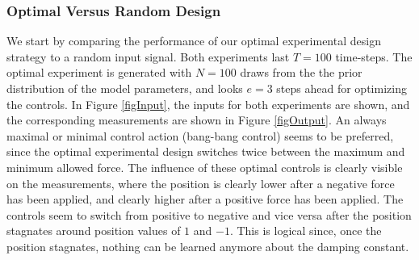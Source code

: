 \subsubsection{Optimal Versus Random Design}
We start by comparing the performance of our optimal experimental design strategy to a random input signal. Both experiments last $T=100$ time-steps. The optimal experiment is generated with $N=100$ draws from the the prior distribution of the model parameters, and looks $e=3$ steps ahead for optimizing the controls. In Figure \ref{figInput}, the inputs for both experiments are shown, and the corresponding measurements are shown in Figure \ref{figOutput}. An always maximal or minimal control action (bang-bang control) seems to be preferred, since the optimal experimental design switches twice between the maximum and minimum allowed force. The influence of these optimal controls is clearly visible on the measurements, where the position is clearly lower after a negative force has been applied, and clearly higher after a positive force has been applied. The controls seem to switch from positive to negative and vice versa after the position stagnates around position values of $1$ and $-1$. This is logical since, once the position stagnates, nothing can be learned anymore about the damping constant.
